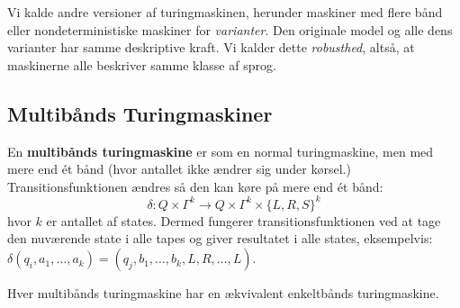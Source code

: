 Vi kalde andre versioner af turingmaskinen, herunder maskiner med flere bånd eller nondeterministiske maskiner for \textit{varianter}. Den originale model og alle dens varianter har samme deskriptive kraft. Vi kalder dette \textit{robusthed}, altså, at maskinerne alle beskriver samme klasse af sprog.

\subsection{Multibånds Turingmaskiner}%
\label{subsec:multitape}

En \textbf{multibånds turingmaskine} er som en normal turingmaskine, men med mere end ét bånd (hvor antallet ikke ændrer sig under kørsel.) Transitionsfunktionen ændres så den kan køre på mere end ét bånd:
\[ \delta : Q \times \Gamma^{k} \longrightarrow Q \times \Gamma^{k} \times \{L,R,S\}^{k}\] hvor $k$ er antallet af states. Dermed fungerer transitionsfunktionen ved at tage den nuværende state i alle tapes og giver resultatet i alle states, eksempelvis: $\delta(q_{i}, a_{1}, \ldots, a_{k}) = (q_{j}, b_{1}, \ldots, b_{k}, L, R, \ldots, L)$.

\begin{theorem}
  \label{teo:multitapeequiv}
  Hver multibånds turingmaskine har en ækvivalent enkeltbånds turingmaskine.
\end{theorem}

